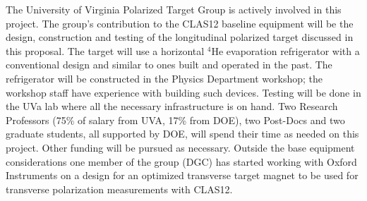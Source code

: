 The University of Virginia Polarized Target Group is actively involved in this
project.
The group's contribution to the CLAS12 baseline equipment will be the
design, construction and testing of the longitudinal polarized target
discussed in this proposal. The target  will use a horizontal  $^{4}$He
evaporation refrigerator with a conventional design and similar to ones built
and operated in the past. The refrigerator will be constructed in the Physics
Department workshop; the workshop staff have experience with building such
devices. Testing will be done in the UVa lab where all the necessary
infrastructure is on hand. 
Two Research Professors (75\% of salary from UVA, 17\% from DOE), two Post-Docs
and two graduate students, all supported by DOE, will spend their time as
needed on this project. Other funding will be pursued as necessary.
Outside the base equipment considerations one member of the group (DGC) has started
working with Oxford Instruments on a design for an optimized transverse target
magnet to be used for transverse polarization measurements with CLAS12.
